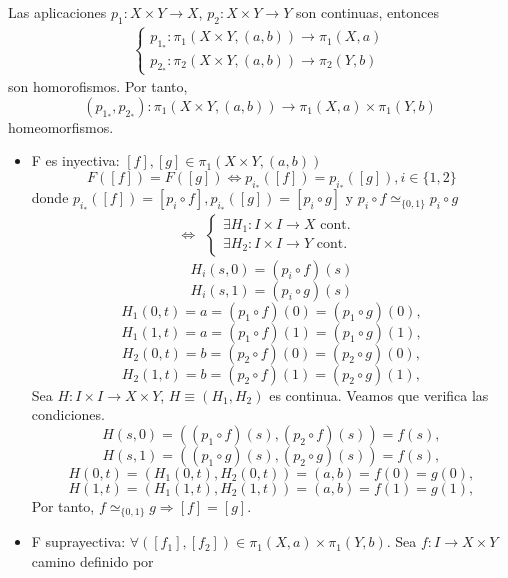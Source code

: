 \begin{dem}
  Las aplicaciones $p_{1} : X \times Y \to X$, $p_{2} : X \times Y \to Y$ son continuas, entonces
  \[ 
    \begin{aligned}
      \begin{cases}
        p_{1}_* : \pi_{1}(X \times Y, (a, b)) \to \pi_{1}(X, a) \\
        p_{2}_* : \pi_{2}(X \times Y, (a, b)) \to \pi_{2}(Y, b)
      \end{cases}
    \end{aligned} 
  \] 
  son homorofismos. Por tanto,
  \[ 
    (p_{1}_*, p_{2}_*) : \pi_{1}(X \times Y, (a, b)) \to \pi_{1}(X, a) \times \pi_{1}(Y, b) 
  \] 
  homeomorfismos.
  \begin{itemize}
    \item F es inyectiva: $[f], [g] \in \pi_{1}(X \times Y, (a, b))$
      \[ 
        F([f]) = F([g]) \Leftrightarrow p_{i}_*([f]) = p_{i}_*([g]), i \in \{ 1, 2 \}
      \] 
      donde $p_{i}_*([f]) = [p_{i} \circ f],  p_{i}_*([g]) = [p_{i} \circ g]$ y $p_{i} \circ f \simeq_{\{ 0, 1 \}} p_{i} \circ g$
      \[ 
        \Leftrightarrow
        \begin{aligned}
          \begin{cases}
            \exists H_{1} : I \times I \to X \text{ cont. } \\
            \exists H_{2} : I \times I \to Y \text{ cont. }
          \end{cases}
        \end{aligned} 
      \] 
      \[ 
        H_{i}(s, 0) = (p_{i} \circ f)(s) 
      \] 
      \[ 
        H_{i}(s, 1) = (p_{i} \circ g)(s) 
      \] 
      \[ 
        H_{1}(0, t) = a = (p_{1} \circ f)(0) = (p_{1} \circ g)(0), 
      \] 
      \[ 
        H_{1}(1, t) = a = (p_{1} \circ f)(1) = (p_{1} \circ g)(1),
      \] 
      \[ 
        H_{2}(0, t) = b = (p_{2} \circ f)(0) = (p_{2} \circ g)(0),
      \] 
      \[ 
        H_{2}(1, t) = b = (p_{2} \circ f)(1) = (p_{2} \circ g)(1),
      \] 
      Sea $H : I \times I \to X \times Y$, $H \equiv (H_{1}, H_{2})$ es continua. Veamos que verifica las condiciones.
      \[ 
        H(s, 0) = ((p_{1} \circ f)(s), (p_{2} \circ f)(s)) = f(s),
      \] 
      \[ 
        H(s, 1) = ((p_{1} \circ g)(s), (p_{2} \circ g)(s)) = f(s),
      \] 
      \[ 
        H(0,t) = (H_{1}(0, t), H_{2}(0, t)) = (a, b) = f(0) = g(0),
      \] 
      \[ 
        H(1, t) = (H_{1}(1, t), H_{2}(1, t)) = (a, b) = f(1) = g(1),
      \] 
      Por tanto, $f \simeq_{\{ 0, 1 \}} g \Rightarrow [f] = [g]$.
    \item F suprayectiva: $\forall ([f_{1}], [f_{2}]) \in \pi_{1}(X, a) \times \pi_{1}(Y, b)$. Sea $f : I \to X \times Y$ camino definido por

\end{itemize}
\end{dem}
